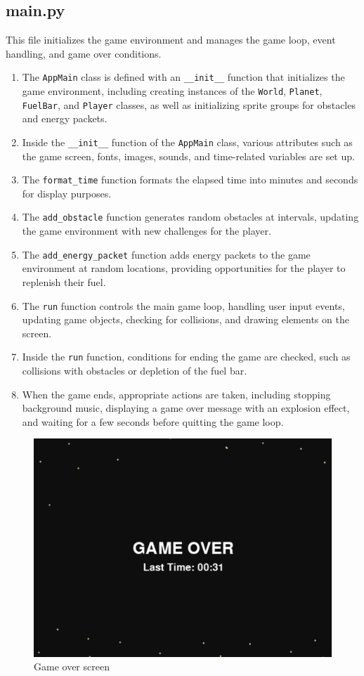 \documentclass[11pt, a4paper]{article}
\begin{document}
\subsection{main.py}
This file initializes the game environment and manages the game loop, event handling, and game over conditions.

\begin{enumerate}
\item The \texttt{AppMain} class is defined with an \texttt{\_\_init\_\_} function that initializes the game environment, including creating instances of the \texttt{World}, \texttt{Planet}, \texttt{FuelBar}, and \texttt{Player} classes, as well as initializing sprite groups for obstacles and energy packets.
\item Inside the \texttt{\_\_init\_\_} function of the \texttt{AppMain} class, various attributes such as the game screen, fonts, images, sounds, and time-related variables are set up.
\item The \texttt{format\_time} function formats the elapsed time into minutes and seconds for display purposes.
\item The \texttt{add\_obstacle} function generates random obstacles at intervals, updating the game environment with new challenges for the player.
\item The \texttt{add\_energy\_packet} function adds energy packets to the game environment at random locations, providing opportunities for the player to replenish their fuel.
\item The \texttt{run} function controls the main game loop, handling user input events, updating game objects, checking for collisions, and drawing elements on the screen.
\item Inside the \texttt{run} function, conditions for ending the game are checked, such as collisions with obstacles or depletion of the fuel bar.
\item When the game ends, appropriate actions are taken, including stopping background music, displaying a game over message with an explosion effect, and waiting for a few seconds before quitting the game loop.
\end{enumerate}

\begin{figure}[h]
\centering
\includegraphics[scale=0.5]{figure3}
\caption{Game over screen}
\end{figure}
\end{document}
